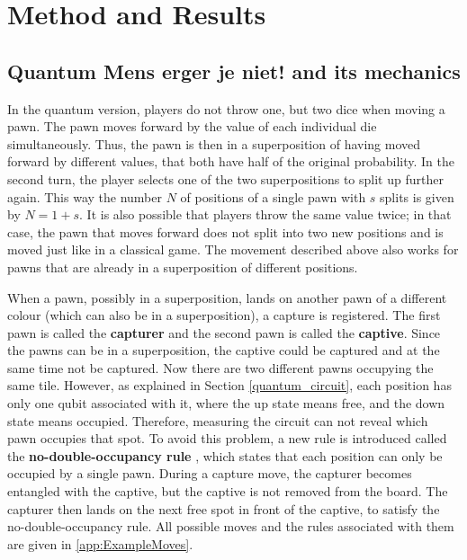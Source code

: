 \documentclass[final,5p,times,twocolumn,authoryear]{elsarticle}
\begin{document}
\section{Method and Results}\label{Main}
\subsection{Quantum Mens erger je niet! and its mechanics}\label{GameMechanics}
In the quantum version, players do not throw one, but two dice when moving a pawn. The pawn moves forward by the value of each individual die simultaneously. Thus, the pawn is then in a superposition of having moved forward by different values, that both have half of the original probability. In the second turn, the player selects one of the two superpositions to split up further again. This way the number $N$ of positions of a single pawn with $s$ splits is given by $N = 1 + s$. It is also possible that players throw the same value twice; in that case, the pawn that moves forward does not split into two new positions and is moved just like in a classical game. The movement described above also works for pawns that are already in a superposition of different positions. 

When a pawn, possibly in a superposition, lands on another pawn of a different colour (which can also be in a superposition), a capture is registered. The first pawn is called the \textbf{capturer} and the second pawn is called the \textbf{captive}. Since the pawns can be in a superposition, the captive could be captured and at the same time not be captured. Now there are two different pawns occupying the same tile. However, as explained in Section \ref{quantum_circuit}, each position has only one qubit associated with it, where the up state means free, and the down state means occupied. Therefore, measuring the circuit can not reveal which pawn occupies that spot. To avoid this problem, a new rule is introduced called the \textbf{no-double-occupancy rule} \cite{cantwell2019quantumchessdevelopingmathematical}, which states that each position can only be occupied by a single pawn. During a capture move, the capturer becomes entangled with the captive, but the captive is not removed from the board. The capturer then lands on the next free spot in front of the captive, to satisfy the no-double-occupancy rule.  All possible moves and the rules associated with them are given in \ref{app:ExampleMoves}. \\

\end{document}

